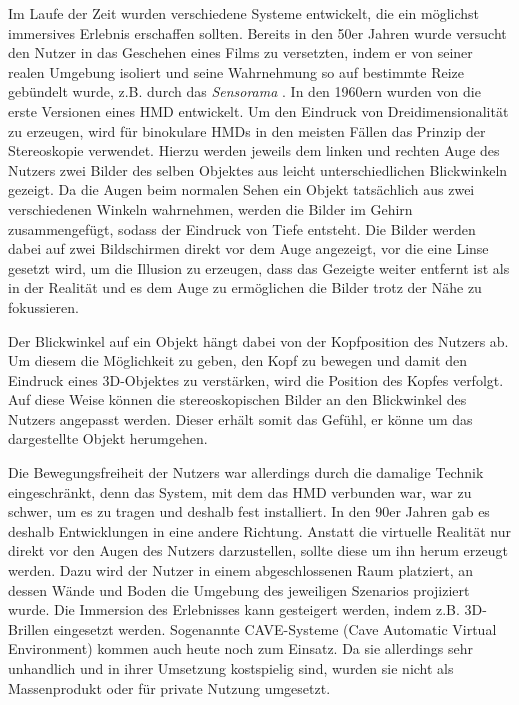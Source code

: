 Im Laufe der Zeit wurden verschiedene Systeme entwickelt, die ein möglichst immersives Erlebnis erschaffen sollten. 
Bereits in den 50er Jahren wurde versucht den Nutzer in das Geschehen eines Films zu versetzten, indem er von seiner realen Umgebung isoliert und seine Wahrnehmung so auf bestimmte Reize gebündelt wurde, z.B. durch das \textit{Sensorama} \cite{sensorama}. %
In den 1960ern wurden von \cite{Sutherland68} die erste Versionen eines HMD entwickelt. %
Um den Eindruck von Dreidimensionalität zu erzeugen, wird für binokulare HMDs in den meisten Fällen das Prinzip der Stereoskopie verwendet. Hierzu werden jeweils dem linken und rechten Auge des Nutzers zwei Bilder des selben Objektes aus leicht unterschiedlichen Blickwinkeln  gezeigt. Da die Augen beim normalen Sehen ein Objekt tatsächlich aus zwei verschiedenen Winkeln wahrnehmen, werden die Bilder im Gehirn zusammengefügt, sodass der Eindruck von Tiefe entsteht. Die Bilder werden dabei auf zwei Bildschirmen direkt vor dem Auge angezeigt, vor die eine Linse gesetzt wird, um die Illusion zu erzeugen, dass das Gezeigte weiter entfernt ist als in der Realität und es dem Auge zu ermöglichen die Bilder trotz der Nähe zu fokussieren.

Der Blickwinkel auf ein Objekt hängt dabei von der Kopfposition des Nutzers ab. Um diesem die Möglichkeit zu geben, den Kopf zu bewegen und damit den Eindruck eines 3D-Objektes zu verstärken, wird die Position des Kopfes verfolgt. Auf diese Weise können die stereoskopischen Bilder an den Blickwinkel des Nutzers angepasst werden. Dieser erhält somit das Gefühl, er könne um das dargestellte Objekt herumgehen. 

Die Bewegungsfreiheit der Nutzers war allerdings durch die damalige Technik eingeschränkt, denn das System, mit dem das HMD verbunden war, war zu schwer, um es zu tragen und deshalb fest installiert. 
In den 90er Jahren gab es deshalb Entwicklungen in eine andere Richtung. Anstatt die virtuelle Realität nur direkt vor den Augen des Nutzers darzustellen, sollte diese um ihn herum erzeugt werden. Dazu wird der Nutzer in einem abgeschlossenen Raum platziert, an dessen Wände und Boden die Umgebung des jeweiligen Szenarios projiziert wurde. Die Immersion des Erlebnisses kann gesteigert werden, indem z.B. 3D-Brillen eingesetzt werden. Sogenannte CAVE-Systeme (Cave Automatic Virtual Environment) kommen auch heute noch zum Einsatz. Da sie allerdings sehr unhandlich und in ihrer Umsetzung kostspielig sind, wurden sie nicht als Massenprodukt oder für private Nutzung umgesetzt.

